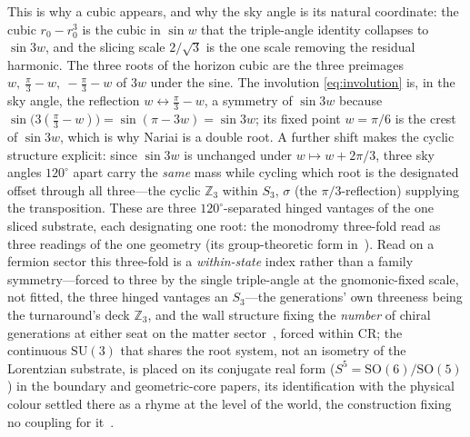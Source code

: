 \documentclass[11pt,a4paper]{article}
\theoremstyle{definition}
\begin{document}
This is why a cubic appears, and why the sky angle is its natural coordinate: the cubic $r_{0}-r_{0}^{3}$ is the cubic in $\sin w$ that the triple-angle identity collapses to $\sin 3w$, and the slicing scale $2/\sqrt3$ is the one scale removing the residual harmonic. The three roots of the horizon cubic are the three preimages $w,\ \tfrac{\pi}{3}-w,\ -\tfrac{\pi}{3}-w$ of $3w$ under the sine. The involution \eqref{eq:involution} is, in the sky angle, the reflection $w\leftrightarrow\tfrac{\pi}{3}-w$, a symmetry of $\sin 3w$ because $\sin\!\bigl(3(\tfrac{\pi}{3}-w)\bigr)=\sin(\pi-3w)=\sin 3w$; its fixed point $w=\pi/6$ is the crest of $\sin 3w$, which is why Nariai is a double root. A further shift makes the cyclic structure explicit: since $\sin 3w$ is unchanged under $w\mapsto w+2\pi/3$, three sky angles $120^\circ$ apart carry the \emph{same} mass while cycling which root is the designated offset through all three---the cyclic $\mathbb{Z}_3$ within $S_3$, $\sigma$ (the $\pi/3$-reflection) supplying the transposition. These are three $120^\circ$-separated hinged vantages of the one sliced substrate, each designating one root: the monodromy three-fold read as three readings of the one geometry (its group-theoretic form in~\cite{JanzenGroupoid}). Read on a fermion sector this three-fold is a \emph{within-state} index rather than a family symmetry---forced to three by the single triple-angle at the gnomonic-fixed scale, not fitted, the three hinged vantages an $S_3$---the generations' own threeness being the turnaround's deck $\mathbb{Z}_3$, and the wall structure fixing the \emph{number} of chiral generations at either seat on the matter sector~\cite{JanzenMatter}, forced within CR; the continuous $\mathrm{SU}(3)$ that shares the root system, not an isometry of the Lorentzian substrate, is placed on its conjugate real form ($S^{5}=\mathrm{SO}(6)/\mathrm{SO}(5)$) in the boundary and geometric-core papers, its identification with the physical colour settled there as a rhyme at the level of the world, the construction fixing no coupling for it~\cite{JanzenBoundary,JanzenGeometricCore}.
\end{document}
